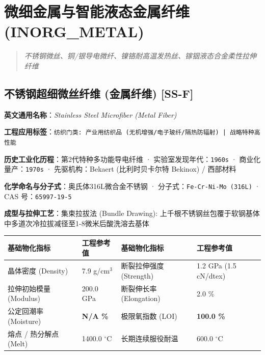 \documentclass[11pt,openright,twoside,UTF8]{ctexbook}
\begin{document}
\chapter{微细金属与智能液态金属纤维 (INORG\_METAL)}
\begin{quote}
\small\itshape
不锈钢微丝、铜/银导电微纤、镍铬耐高温发热丝、镓铟液态合金柔性拉伸纤维
\end{quote}

\section{不锈钢超细微丝纤维 (金属纤维) [SS-F]}
\label{sec:ss-f}

\noindent\textbf{英文通用名称}：\textit{Stainless Steel Microfiber (Metal Fiber)}\par
\noindent\textbf{工程应用标签}：\texttt{纺织门类: 产业用纺织品 (无机增强/电子玻纤/隔热防辐射) | 战略特种高性能}\par
\noindent\textbf{历史工业化历程}：第2代特种多功能导电纤维 · 实验室发现年代：\texttt{1960s} · 商业化量产：\texttt{1970s} · 先驱机构：Bekaert (比利时贝卡尔特 Bekinox) / 西部材料\par
\noindent\textbf{化学命名与分子式}：奥氏体316L微合金不锈钢 · 分子式：\texttt{Fe-Cr-Ni-Mo (316L)} · CAS 号：\texttt{65997-19-5}\par
\noindent\textbf{成型与拉伸工艺}：集束拉拔法 (Bundle Drawing): 上千根不锈钢丝包覆于软钢基体中多道次冷拉拔减径至1-8微米后酸洗溶去基体\par

\vspace{0.15cm}
\begin{center}
\small
\begin{tabularx}{\textwidth}{p{3.8cm}Xp{3.8cm}X}
\toprule
\textbf{基础物化指标} & \textbf{工程参考值} & \textbf{基础物化指标} & \textbf{工程参考值} \\
\midrule
晶体密度 (Density) & 7.9 g/cm$^3$ & 断裂拉伸强度 (Strength) & 1.2 GPa (1.5 cN/dtex) \\
拉伸初始模量 (Modulus) & 200.0 GPa & 断裂伸长率 (Elongation) & 2.0 \% \\
公定回潮率 (Moisture) & \textbf{N/A \%} & 极限氧指数 (LOI) & \textbf{100.0 \%} \\
熔点 / 热分解点 (Melt) & 1400.0 $^\circ\mathrm{C}$ & 长期连续服役耐温 & 600.0 $^\circ\mathrm{C}$ \\
\bottomrule
\end{tabularx}
\end{center}
\vspace{0.15cm}
\end{document}
